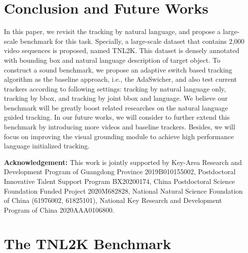 \documentclass[final]{cvpr}
\begin{document}
 
\section{Conclusion and Future Works} 
In this paper, we revisit the tracking by natural language, and propose a large-scale benchmark for this task. Specially, a large-scale dataset that contains 2,000 video sequences is proposed, named TNL2K. This dataset is densely annotated with bounding box and natural language description of target object. To construct a sound benchmark, we propose an adaptive switch based tracking algorithm as the baseline approach, i.e., the AdaSwicher, and also test current trackers according to following settings: tracking by natural language only, tracking by bbox, and tracking by joint bbox and language. We believe our benchmark will be greatly boost related researches on the natural language guided tracking. In our future works, we will consider to further extend this benchmark by introducing more videos and baseline trackers. Besides, we will focus on improving the visual grounding module to achieve high performance language initialized tracking. 




\noindent \scriptsize{\textbf{Acknowledgement: } This work is jointly supported by Key-Area Research and Development Program of Guangdong Province 2019B010155002, Postdoctoral Innovative Talent Support Program BX20200174, China Postdoctoral Science Foundation Funded Project 2020M682828, National Natural Science Foundation of China (61976002, 61825101), National Key Research and Development Program of China 2020AAA0106800.}

 
 
\small{ 


}


\clearpage








\appendix


\section{The TNL2K Benchmark}    
\end{document}
